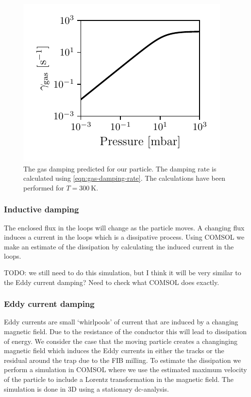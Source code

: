 \begin{figure}
    \centering
    \includegraphics{figures/data/gas_damping.pdf}
    \caption{The gas damping predicted for our particle. The damping rate is calculated using \autoref{eqn:gas-damping-rate}. The calculations have been performed for $T=\qty{300}{\kelvin}$.}
    \label{fig:gas-damping}
\end{figure}

\subsubsection{Inductive damping}
\label{subsubsec:inductive-damping}
The enclosed flux in the loops will change as the particle moves. A changing flux induces a current in the loops which is a dissipative process. Using COMSOL we make an estimate of the dissipation by calculating the induced current in the loops.

TODO: we still need to do this simulation, but I think it will be very similar to the Eddy current damping? Need to check what COMSOL does exactly.

\subsubsection{Eddy current damping}
\label{subsubsec:eddy-current-damping}
Eddy currents are small `whirlpools' of current that are induced by a changing magnetic field. Due to the resistance of the conductor this will lead to dissipation of energy. We consider the case that the moving particle creates a changinging magnetic field which induces the Eddy currents in either the tracks or the residual  around the trap due to the FIB milling. To estimate the dissipation we perform a simulation in COMSOL where we use the estimated maximum velocity of the particle to include a Lorentz transformation in the magnetic field. The simulation is done in 3D using a stationary dc-analysis.
